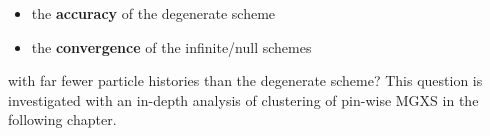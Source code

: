 \begin{itemize}[noitemsep]
\item the \textbf{accuracy} of the degenerate scheme
\item the \textbf{convergence} of the infinite/null schemes
\end{itemize}

\noindent with far fewer particle histories than the degenerate scheme? This question is investigated with an in-depth analysis of clustering of pin-wise \ac{MGXS} in the following chapter.



\clearpage


